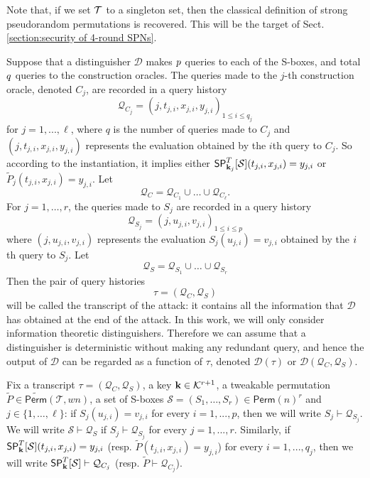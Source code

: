 Note that, if we set $\mathcal{T}$ to a singleton set, then the classical definition of strong pseudorandom permutations is recovered. This will be the target of Sect. \ref{section:security of 4-round SPNs}.






\arrangespace

{}
%
Suppose that a distinguisher $\mathcal{D}$ makes $\mathnormal{p}$ queries to each of the S-boxes, and total $\mathnormal{q}$ queries to the construction oracles. The queries made to the $j$-th construction oracle, denoted $C_j$, are recorded in a query history
%
$$
\mathcal{Q}_{C_j} = (j,t_{j,i},x_{j,i},y_{j,i})_{1 \leq i \leq q_j}
$$
%
for $j=1,...,\ell$, where $q$ is the number of queries made to $C_j$ and $(j,t_{j,i},x_{j,i},y_{j,i})$ represents the evaluation obtained by the $i$th query to $C_j$. So according to the instantiation, it implies either $\mathsf{SP}_{\mathbf{k}_j}^T[\mathcal{S}](t_{j,i},x_{j,i}) = y_{j,i}$  or $\widetilde{P}_j(t_{j,i},x_{j,i}) = y_{j,i}$. Let
%
$$\mathcal{Q}_{C}=\mathcal{Q}_{C_1}\cup\ldots\cup\mathcal{Q}_{C_\ell}.$$
%
For $j = 1,\ldots,r$, the queries made to $S_j$ are recorded in a query history
%
$$
\mathcal{Q}_{S_j} = (j, u_{j,i}, v_{j,i})_{1 \leq i \leq p}
$$
%
where $(j, u_{j,i}, v_{j,i})$  represents the evaluation $S_j(u_{j,i}) = v_{j,i}$ obtained by the $\mathnormal{i}$th query to $S_j$. Let
%
$$
\mathcal{Q}_{S}=\mathcal{Q}_{S_1} \cup \ldots \cup \mathcal{Q}_{S_r}
$$
%
Then the pair of query histories
%
$$
\tau = (\mathcal{Q}_{C}, \mathcal{Q}_{S})
$$
%
will be called the transcript of the attack: it contains all the information that $\mathcal{D}$ has obtained at the end of the attack. In this work, we will only consider
information theoretic distinguishers. Therefore we can assume that a distinguisher is deterministic without making any redundant query, and hence the output of  $\mathcal{D}$  can be regarded as a function of $\tau$, denoted $\mathcal{D}(\tau)$ or $\mathcal{D}(\mathcal{Q}_C, \mathcal{Q}_S)$.





Fix a transcript $\tau = (\mathcal{Q}_C,\mathcal{Q}_S)$, a key $\mathbf{k} \in \mathcal{K}^{r+1}$, a tweakable permutation $\widetilde{P} \in \widetilde{\mathsf{Perm}}(\mathcal{T}, w n)$,  a set of S-boxes $\mathcal{S}=(S_1, \ldots  ,S_r) \in \mathsf{Perm}(n)^r $ and $j \in \{1, \ldots, \ell \}$: if $S_j(u_{j,i})=v_{j,i}$ for every $i = 1, . . . , p$, then we will write $S_j\vdash\mathcal{Q}_{S_j}$. We will write $\mathcal{S}\vdash\mathcal{Q}_S$ if $S_j\vdash\mathcal{Q}_{S_j}$ for every $j = 1, . . . , r$. Similarly, if
$\mathsf{SP}_{\mathbf{k}}^T[\mathcal{S}](t_{j,i}, x_{j,i}) = y_{j,i}$ (resp. $\widetilde{P}(t_{j,i}, x_{j,i}) = y_{j,i}$) for every $i = 1, . . . , q_j$, then we will write $\mathsf{SP}_{\mathbf{k}}^T[\mathcal{S}]\vdash\mathcal{Q}_{C_j}$ (resp. $\widetilde{P}\vdash\mathcal{Q}_{C_j}$).


